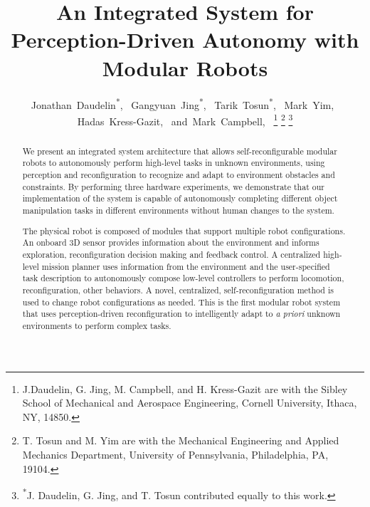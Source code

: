 \documentclass[journal]{IEEEtran}
\begin{document}
\title{An Integrated System for Perception-Driven Autonomy with Modular Robots}
\author{Jonathan~Daudelin\textsuperscript{*},~
        Gangyuan~Jing\textsuperscript{*},~
        Tarik~Tosun\textsuperscript{*},~
        Mark~Yim,~
        Hadas~Kress-Gazit,~
        and~Mark~Campbell,~%
\thanks{J.Daudelin, G. Jing, M. Campbell, and H. Kress-Gazit are with the Sibley School of Mechanical and Aerospace Engineering, Cornell University, Ithaca,
NY, 14850.}%
\thanks{T. Tosun and M. Yim are with the Mechanical Engineering and Applied Mechanics Department, University of Pennsylvania, Philadelphia, PA, 19104.}%
\thanks{\textsuperscript{*}J. Daudelin, G. Jing, and T. Tosun contributed equally to this work.}}


\maketitle

\begin{abstract}

We present an integrated system architecture that allows self-reconfigurable modular robots to autonomously perform high-level tasks in unknown environments, using perception and reconfiguration to recognize and adapt to environment obstacles and constraints.  By performing three hardware experiments, we demonstrate that our implementation of the system is capable of autonomously completing different object manipulation tasks in different environments without human changes to the system.

The physical robot is composed of modules that support multiple robot configurations. An onboard 3D sensor provides information about the environment and informs exploration, reconfiguration decision making and feedback control.  A centralized high-level mission planner uses information from the environment and the user-specified task description to autonomously compose low-level controllers to perform locomotion, reconfiguration, other behaviors. A novel, centralized, self-reconfiguration method is used to change robot configurations as needed. This is the first modular robot system that uses perception-driven reconfiguration to intelligently adapt to \textit{a priori} unknown environments to perform complex tasks.

\end{abstract}
\end{document}
